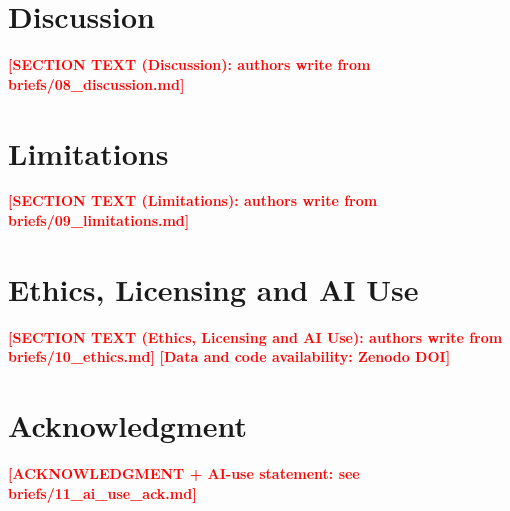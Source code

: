 \documentclass[conference]{IEEEtran}
\newcommand{\placeholder}[1]{\textcolor{red}{\textbf{[#1]}}}
\begin{document}
\section{Discussion}\label{sec:discussion}
\placeholder{SECTION TEXT (Discussion): authors write from briefs/08_discussion.md}


\section{Limitations}\label{sec:limitations}
\placeholder{SECTION TEXT (Limitations): authors write from briefs/09_limitations.md}


\section{Ethics, Licensing and AI Use}\label{sec:ethics}
\placeholder{SECTION TEXT (Ethics, Licensing and AI Use): authors write from briefs/10_ethics.md}
\placeholder{Data and code availability: Zenodo DOI}



\section*{Acknowledgment}
\placeholder{ACKNOWLEDGMENT + AI-use statement: see briefs/11_ai_use_ack.md}



\end{document}
